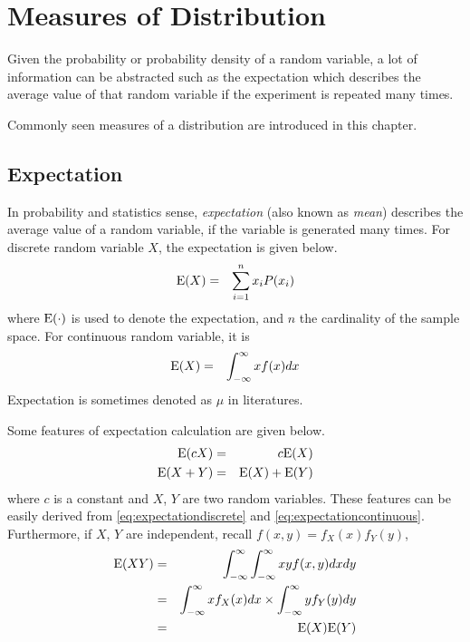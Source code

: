 \chapter{Measures of Distribution} \label{ch:measuresdistribution}

Given the probability or probability density of a random variable, a lot of information can be abstracted such as the expectation which describes the average value of that random variable if the experiment is repeated many times.

Commonly seen measures of a distribution are introduced in this chapter.

\section{Expectation}

In probability and statistics sense, \textit{expectation} (also known as \textit{mean}) describes the average value of a random variable, if the variable is generated many times. For discrete random variable $X$, the expectation is given below.
\begin{eqnarray}
  \textup{E}(X) &=& \sum_{i=1}^{n}x_iP(x_i) \label{eq:expectationdiscrete}
\end{eqnarray}
where $\textup{E}(\cdot)$ is used to denote the expectation, and $n$ the cardinality of the sample space. For continuous random variable, it is
\begin{eqnarray}
  \textup{E}(X) &=& \int_{-\infty}^{\infty}xf(x)dx \label{eq:expectationcontinuous}
\end{eqnarray}
Expectation is sometimes denoted as $\mu$ in literatures.

Some features of expectation calculation are given below.
\begin{eqnarray}
  \textup{E}(cX) &=& c\textup{E}(X) \nonumber \\
  \textup{E}(X+Y) &=& \textup{E}(X) + \textup{E}(Y) \nonumber
\end{eqnarray}
where $c$ is a constant and $X$, $Y$ are two random variables. These features can be easily derived from \eqref{eq:expectationdiscrete} and \eqref{eq:expectationcontinuous}. Furthermore, if $X$, $Y$ are independent, recall $f(x,y) = f_X(x)f_Y(y)$,
\begin{eqnarray}
  \textup{E}(XY) &=& \int_{-\infty}^{\infty}\int_{-\infty}^{\infty} xyf(x, y)dxdy \nonumber \\
  &=& \int_{-\infty}^{\infty}xf_X(x)dx \times \int_{-\infty}^{\infty}yf_Y(y)dy \nonumber \\
  &=& \textup{E}(X)\textup{E}(Y) \nonumber
\end{eqnarray}

